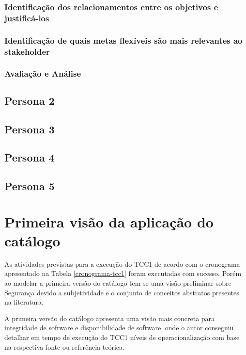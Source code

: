 \subsubsection{Identificação dos relacionamentos entre os objetivos e justificá-los}

\subsubsection{Identificação de quais metas flexíveis são mais relevantes ao stakeholder}

\subsubsection{Avaliação e Análise}




\subsection{Persona 2}
\label{subsec:persona2}

\subsection{Persona 3}
\label{subsec:persona3}

\subsection{Persona 4}
\label{subsec:persona4}

\subsection{Persona 5}
\label{subsec:persona5}

\section{Primeira visão da aplicação do catálogo}
\label{sec: aplicacaoDoCatalogo}
As atividades previstas para a execução do TCC1 de acordo com o cronograma apresentado na Tabela \ref{cronograma-tcc1} foram executadas com sucesso. Porém ao modelar a primeira versão do catálogo tem-se uma visão preliminar sobre Segurança devido a subjetividade e o conjunto de conceitos abstratos presentes na literatura.

A primeira versão do catálogo apresenta uma visão mais concreta para integridade de software e disponibilidade de software, onde o autor conseguiu detalhar em tempo de execução do TCC1 níveis de operacionalização com base na respectiva fonte ou referência teórica.

